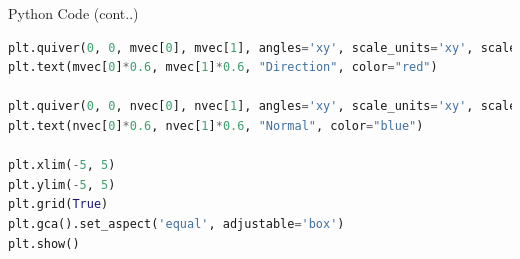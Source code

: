 \documentclass{beamer}
\begin{document}
\begin{frame}[fragile]{Python Code (cont..)}
\begin{lstlisting}[language=Python]
plt.quiver(0, 0, mvec[0], mvec[1], angles='xy', scale_units='xy', scale=1, color='red')
plt.text(mvec[0]*0.6, mvec[1]*0.6, "Direction", color="red")

plt.quiver(0, 0, nvec[0], nvec[1], angles='xy', scale_units='xy', scale=1, color='blue')
plt.text(nvec[0]*0.6, nvec[1]*0.6, "Normal", color="blue")

plt.xlim(-5, 5)
plt.ylim(-5, 5)
plt.grid(True)
plt.gca().set_aspect('equal', adjustable='box')
plt.show()
\end{lstlisting}
\end{frame}
\end{document}
